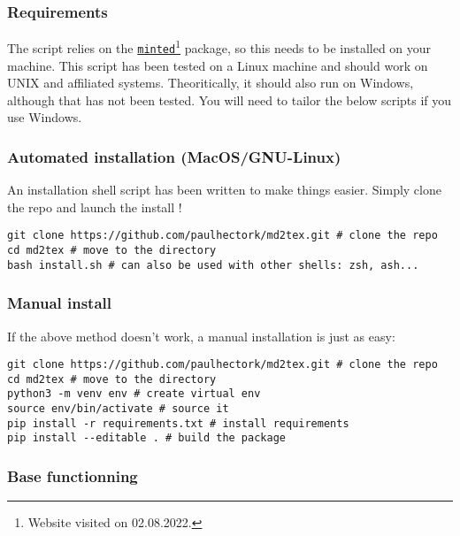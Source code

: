 \documentclass[a4paper, 12pt, twoside]{article}
\begin{document}
\subsubsection{Requirements}

The script relies on the \href{http://tug.ctan.org/macros/latex/contrib/minted/minted.pdf}{\texttt{minted}}\footnote{Website visited on 02.08.2022.} package,
so this needs to be installed on your machine. This script has been tested on a Linux machine and should
work on UNIX and affiliated systems. Theoritically, it should also run on Windows, although that has not
been tested. You will need to tailor the below scripts if you use Windows.
\subsubsection{Automated installation (MacOS/GNU-Linux)}

An installation shell script has been written to make things easier.
Simply clone the repo and launch the install !

\begin{listing}[h!]
   \begin{verbatim}
git clone https://github.com/paulhectork/md2tex.git # clone the repo
cd md2tex # move to the directory
bash install.sh # can also be used with other shells: zsh, ash...

   \end{verbatim}
\end{listing}
\subsubsection{Manual install}

If the above method doesn't work, a manual installation is just as easy:

\begin{listing}[h!]
   \begin{verbatim}
git clone https://github.com/paulhectork/md2tex.git # clone the repo
cd md2tex # move to the directory
python3 -m venv env # create virtual env
source env/bin/activate # source it
pip install -r requirements.txt # install requirements
pip install --editable . # build the package

   \end{verbatim}
\end{listing}
\subsubsection{Base functionning}
\end{document}
